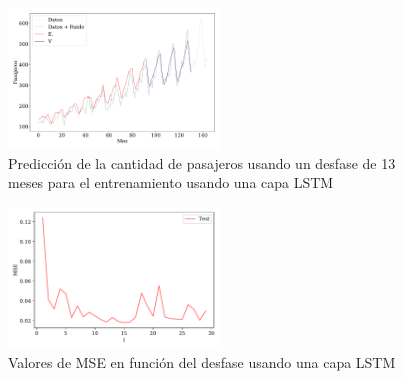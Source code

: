 \begin{figure}
	\begin{small}
		\begin{center}
			\includegraphics[width=0.5\textwidth]{prediccion_l-12.pdf}
		\end{center}
		\caption{Predicción de la cantidad de pasajeros usando un desfase de 13 meses para el entrenamiento usando una capa LSTM}
		\label{fig:l-13-LSTM}
	\end{small}
\end{figure}
\vfill \null 
\begin{figure}[H]
	\begin{small}
		\begin{center}
			\includegraphics[width=0.5\textwidth]{plot.pdf}
		\end{center}
		\caption{Valores de MSE en función del desfase usando una capa LSTM}
		\label{fig:barrido_en_l}
	\end{small}
\end{figure}
